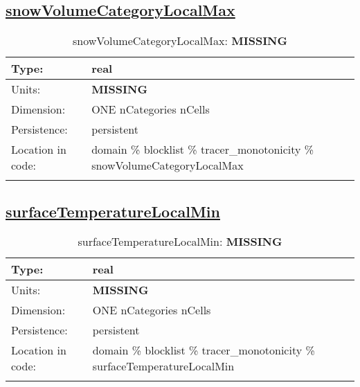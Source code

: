 \subsection[snowVolumeCategoryLocalMax]{\hyperref[sec:var_tab_tracer_monotonicity]{snowVolumeCategoryLocalMax}}
\label{subsec:var_sec_tracer_monotonicity_snowVolumeCategoryLocalMax}
\begin{center}
\begin{longtable}{| p{2.0in} | p{4.0in} |}
        \hline 
        Type: & real \\
        \hline 
        Units: & {\bf \color{red} MISSING} \\
        \hline 
        Dimension: & ONE nCategories nCells \\
        \hline 
        Persistence: & persistent \\
        \hline 
         Location in code: & domain \% blocklist \% tracer\_monotonicity \% snowVolumeCategoryLocalMax \\
         \hline 
    \caption{snowVolumeCategoryLocalMax: {\bf \color{red} MISSING}}
\end{longtable}
\end{center}
\subsection[surfaceTemperatureLocalMin]{\hyperref[sec:var_tab_tracer_monotonicity]{surfaceTemperatureLocalMin}}
\label{subsec:var_sec_tracer_monotonicity_surfaceTemperatureLocalMin}
\begin{center}
\begin{longtable}{| p{2.0in} | p{4.0in} |}
        \hline 
        Type: & real \\
        \hline 
        Units: & {\bf \color{red} MISSING} \\
        \hline 
        Dimension: & ONE nCategories nCells \\
        \hline 
        Persistence: & persistent \\
        \hline 
         Location in code: & domain \% blocklist \% tracer\_monotonicity \% surfaceTemperatureLocalMin \\
         \hline 
    \caption{surfaceTemperatureLocalMin: {\bf \color{red} MISSING}}
\end{longtable}
\end{center}
